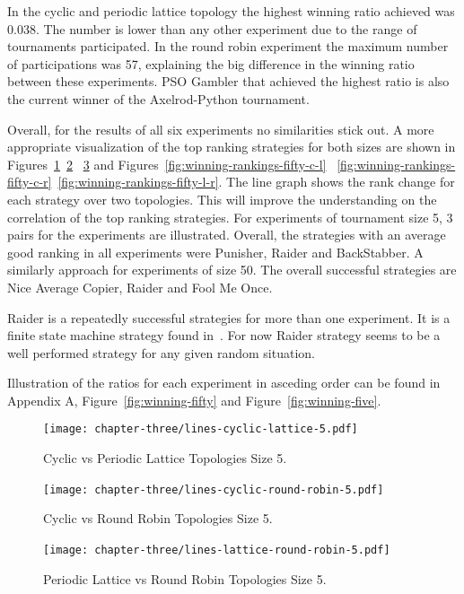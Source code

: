 In the cyclic and periodic lattice topology the highest winning ratio achieved
was 0.038. The number is lower than any other experiment due to the range of
tournaments participated. In the round robin experiment the maximum number of
participations was 57, explaining the big difference in the winning ratio between
these experiments. PSO Gambler that achieved the highest ratio is also the current
winner of the Axelrod-Python tournament.

Overall, for the results of all six experiments no similarities stick out.
A more appropriate visualization of the top ranking strategies for both
sizes are shown in Figures~\ref{fig:winning-rankings-five-c-l}~\ref{fig:winning-rankings-five-c-r}
~\ref{fig:winning-rankings-five-l-r} and Figures~\ref{fig:winning-rankings-fifty-c-l}
~\ref{fig:winning-rankings-fifty-c-r}~\ref{fig:winning-rankings-fifty-l-r}.
The line graph shows the rank change for each strategy over two topologies.
This will improve the understanding on the correlation of the top ranking strategies.
For experiments of tournament size 5, 3
pairs for the experiments are illustrated. Overall, the strategies with an
average good ranking in all experiments were Punisher, Raider and BackStabber.
A similarly approach for experiments of size 50.
The overall successful strategies are Nice Average Copier, Raider and Fool Me Once.

Raider is a repeatedly successful strategies for more than one experiment.
It is a finite state machine strategy found in~\cite{DBLP:conf/foci/AshlockTA14}.
For now Raider strategy seems to be a well performed strategy for any
given random situation.

Illustration of the ratios for each experiment in asceding order can be found
in Appendix A, Figure~\ref{fig:winning-fifty} and Figure~\ref{fig:winning-five}.

\begin{figure}[H]
  \centering
      \texttt{[image: chapter-three/lines-cyclic-lattice-5.pdf]}
  \caption{Cyclic vs Periodic Lattice Topologies Size 5.}
  \label{fig:winning-rankings-five-c-l}
\end{figure}

\begin{figure}[H]
\centering
    \texttt{[image: chapter-three/lines-cyclic-round-robin-5.pdf]}\
\caption{Cyclic vs Round Robin Topologies Size 5.}
\label{fig:winning-rankings-five-c-r}
\end{figure}

\begin{figure}[H]
\centering
    \texttt{[image: chapter-three/lines-lattice-round-robin-5.pdf]}\
\caption{Periodic Lattice vs Round
         Robin Topologies Size 5.}
\label{fig:winning-rankings-five-l-r}
\end{figure}

